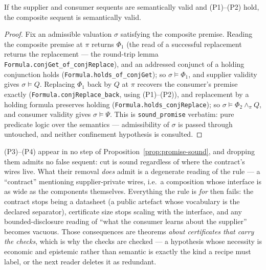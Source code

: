 \begin{bprop}\label{prop:promise-sound}
If the supplier and consumer sequents are semantically valid and
(P1)--(P2) hold, the composite sequent is semantically valid.
\end{bprop}
\begin{proof}
Fix an admissible valuation $\sigma$ satisfying the composite premise.
Reading the composite premise at $\pi$ returns $\Phi_1$ (the read of a
successful replacement returns the replacement --- the round-trip lemma
\texttt{Formula.conjGet\_of\_conjReplace}), and an addressed conjunct
of a holding conjunction holds (\texttt{Formula.holds\_of\_conjGet});
so $\sigma \models \Phi_1$, and supplier validity gives
$\sigma \models Q$. Replacing $\Phi_1$ back by $Q$ at $\pi$ recovers
the consumer's premise exactly
(\texttt{Formula.conjReplace\_back}, using (P1)--(P2)), and replacement
by a holding formula preserves holding
(\texttt{Formula.holds\_conjReplace}); so
$\sigma \models \Phi_2 \wedge_{\pi} Q$, and consumer validity gives
$\sigma \models \Psi$. This is \texttt{sound\_promise} verbatim: pure
predicate logic over the semantics --- admissibility of $\sigma$ is
passed through untouched, and neither confinement hypothesis is
consulted.
\end{proof}

\begin{bremark}
\label{rem:promise-warrant}
(P3)--(P4) appear in no step of Proposition~\ref{prop:promise-sound},
and dropping them admits no false sequent: cut is sound regardless of
where the contract's wires live. What their removal \emph{does} admit
is a degenerate reading of the rule --- a ``contract'' mentioning
supplier-private wires, i.e.\ a composition whose interface is as wide
as the components themselves. Everything the rule is \emph{for} then
fails: the contract stops being a datasheet (a public artefact whose
vocabulary is the declared separator), certificate size stops scaling
with the interface, and any bounded-disclosure reading of ``what the
consumer learns about the supplier'' becomes vacuous. Those
consequences are theorems \emph{about certificates that carry the
checks}, which is why the checks are checked --- a hypothesis whose
necessity is economic and epistemic rather than semantic is exactly
the kind a recipe must label, or the next reader deletes it as
redundant.
\end{bremark}

